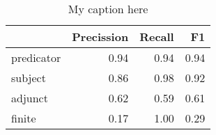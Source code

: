 \begin{table}[!ht]
\centering
\begin{tabular}{lrrr}
\toprule
{} &  Precission &  Recall &   F1 \\
\midrule
predicator &        0.94 &    0.94 & 0.94 \\
subject    &        0.86 &    0.98 & 0.92 \\
adjunct    &        0.62 &    0.59 & 0.61 \\
finite     &        0.17 &    1.00 & 0.29 \\
\bottomrule
\end{tabular}
\caption{My caption here}
\label{tab:unit-elements-ocd-combined-F1}
\end{table}